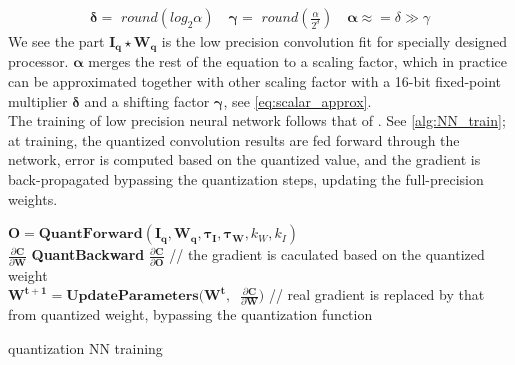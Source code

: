 \begin{equation}
    \begin{aligned}\label{eq:scalar_approx}
        \boldsymbol{\delta}=\textit{ round} ( log_2\alpha)\quad
        \boldsymbol{\gamma}=\textit{ round}( \frac{\alpha}{2^{\delta}})\quad
        \boldsymbol{\alpha}\approx=\delta\gg\gamma
    \end{aligned}    
\end{equation}
We see the part $\boldsymbol{I_q}\star\boldsymbol{W_q}$ is the low precision convolution fit for specially designed processor. $\boldsymbol{\alpha}$ merges the rest of the equation to a scaling factor, which in practice can be approximated together with other scaling factor with a 16-bit fixed-point multiplier $\boldsymbol{\delta}$ and a shifting factor $\boldsymbol{\gamma}$, see \autoref{eq:scalar_approx}. \\
The training of low precision neural network follows that of \cite{XnorNet}. See \autoref{alg:NN_train}; at training, the quantized convolution results are fed forward through the network, error is computed based on the quantized value, and the gradient is back-propagated bypassing the quantization steps, updating the full-precision weights.
\begin{algorithm}
    \SetAlgoLined
        $\boldsymbol{O}=\textbf{QuantForward}(\boldsymbol{I_q},\boldsymbol{W_q},\boldsymbol{\tau_I},\boldsymbol{\tau_W},k_W,k_I )$ \\
        $\frac{\partial \boldsymbol{C} }{\partial \boldsymbol{W}}$
        \text{=\ }\textbf{QuantBackward}\text{(\ }  $\frac{\partial\boldsymbol{C}}{\partial\boldsymbol{O}}$
        // the gradient is caculated based on the quantized weight \\
        $\boldsymbol{W^{t+1}}=\textbf{UpdateParameters}(\boldsymbol{W^t},\ $ $\frac{\partial\boldsymbol{C}}{\partial\boldsymbol{W}})$ 
        // real gradient is replaced by that from quantized weight, bypassing the quantization function
    \caption{quantization NN training}
    \label{alg:NN_train}
\end{algorithm}


